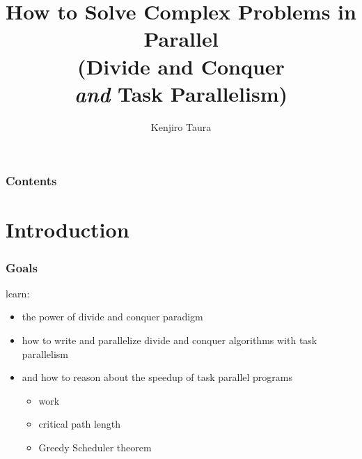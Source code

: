 \documentclass[12pt,dvipdfmx]{beamer}
\title{How to Solve Complex Problems in Parallel \\
(Divide and Conquer \\ {\em and\/} Task Parallelism)}
\institute{}
\author{Kenjiro Taura}
\date{}
\begin{document}
\maketitle

\begin{frame}
\frametitle{Contents}
\tableofcontents
\end{frame}

\section{Introduction}
\begin{frame}
\frametitle{Goals}
learn:
\begin{itemize}
\item the power of divide and conquer paradigm

\item how to write and parallelize
  divide and conquer algorithms with task parallelism

\item and how to reason about the speedup
  of task parallel programs
  \begin{itemize}
  \item work
  \item critical path length
  \item Greedy Scheduler theorem
  \end{itemize}
\end{itemize}
\end{frame}

\end{document}
